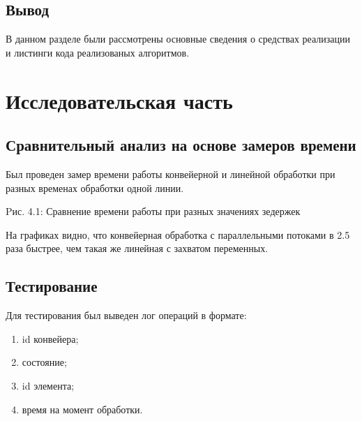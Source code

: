 \documentclass[12pt]{report}
\begin{document}
\section*{Вывод}
В данном разделе были рассмотрены основные сведения о средствах реализации и листинги кода реализованых алгоритмов.

\newpage
\chapter{Исследовательская часть}

\section{Сравнительный анализ на основе замеров времени}

Был проведен замер времени работы конвейерной и линейной обработки при разных временах обработки одной линии.
 
\begin{center}

Pис. 4.1: Сравнение времени работы при разных значениях зедержек
\end{center}


На графиках видно, что конвейерная обработка с параллельными потоками в 2.5 раза быстрее, чем такая же линейная с захватом переменных.

\section{Тестирование}
Для тестирования был выведен лог операций в формате:
\begin{enumerate}
	\item id конвейера; 
	\item состояние;
	\item id элемента; 
	\item время на момент обработки.
\end{enumerate}
\end{document}
